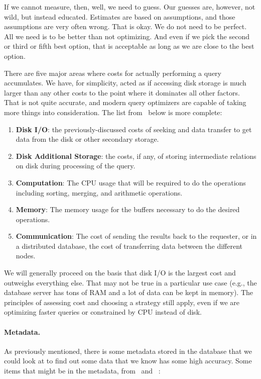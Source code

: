 If we cannot measure, then, well, we need to guess. Our guesses are, however, not wild, but instead educated. Estimates are based on assumptions, and those assumptions are very often wrong. That is okay. We do not need to be perfect. All we need is to be better than not optimizing. And even if we pick the second or third or fifth best option, that is acceptable as long as we are close to the best option.

There are five major areas where costs for actually performing a query accumulates. We have, for simplicity, acted as if accessing disk storage is much larger than any other costs to the point where it dominates all other factors. That is not quite accurate, and modern query optimizers are capable of taking more things into consideration. The list from~\cite{fds} below is more complete:

\begin{enumerate}
	\item \textbf{Disk I/O}: the previously-discussed costs of seeking and data transfer to get data from the disk or other secondary storage.
	\item \textbf{Disk Additional Storage}: the costs, if any, of storing intermediate relations on disk during processing of the query.
	\item \textbf{Computation}: The CPU usage that will be required to do the operations including sorting, merging, and arithmetic operations.
	\item \textbf{Memory}: The memory usage for the buffers necessary to do the desired operations.
	\item \textbf{Communication}: The cost of sending the results back to the requester, or in  a distributed database, the cost of transferring data between the different nodes.
\end{enumerate}

We will generally proceed on the basis that disk I/O is the largest cost and outweighs everything else. That may not be true in a particular use case (e.g., the database server has tons of RAM and a lot of data can be kept in memory). The principles of assessing cost and choosing a strategy still apply, even if we are optimizing faster queries or constrained by CPU instead of disk.

\paragraph{Metadata.} As previously mentioned, there is some metadata stored in the database that we could look at to find out some data that we know has some high accuracy. Some items that might be in the metadata, from~\cite{dsc} and ~\cite{fds}:

